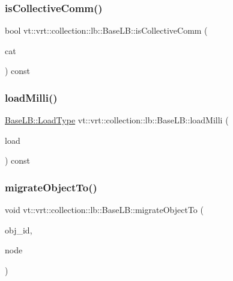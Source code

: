 \subsubsection{\texorpdfstring{is\+Collective\+Comm()}{isCollectiveComm()}}
{\footnotesize\ttfamily bool vt\+::vrt\+::collection\+::lb\+::\+Base\+L\+B\+::is\+Collective\+Comm (\begin{DoxyParamCaption}\item[{\hyperlink{namespacevt_1_1vrt_1_1collection_1_1balance_a9cc6c6884ca0416dae824e9204093c57}{balance\+::\+Comm\+Category}}]{cat }\end{DoxyParamCaption}) const\hspace{0.3cm}{\ttfamily [protected]}}

\mbox{\label{structvt_1_1vrt_1_1collection_1_1lb_1_1_base_l_b_a9293a46022910a7b0b93938dfb886477}} 
\subsubsection{\texorpdfstring{load\+Milli()}{loadMilli()}}
{\footnotesize\ttfamily \hyperlink{structvt_1_1vrt_1_1collection_1_1lb_1_1_base_l_b_a215e22b9f12678303f49615ae3be05cc}{Base\+L\+B\+::\+Load\+Type} vt\+::vrt\+::collection\+::lb\+::\+Base\+L\+B\+::load\+Milli (\begin{DoxyParamCaption}\item[{\hyperlink{structvt_1_1vrt_1_1collection_1_1lb_1_1_base_l_b_a215e22b9f12678303f49615ae3be05cc}{Load\+Type} const \&}]{load }\end{DoxyParamCaption}) const}

\mbox{\label{structvt_1_1vrt_1_1collection_1_1lb_1_1_base_l_b_a952846044ca0d13d25ca828b84112d0e}} 
\subsubsection{\texorpdfstring{migrate\+Object\+To()}{migrateObjectTo()}}
{\footnotesize\ttfamily void vt\+::vrt\+::collection\+::lb\+::\+Base\+L\+B\+::migrate\+Object\+To (\begin{DoxyParamCaption}\item[{\hyperlink{structvt_1_1vrt_1_1collection_1_1lb_1_1_base_l_b_a15a2f756b59c8c2437985206b32aa403}{Obj\+I\+D\+Type} const}]{obj\+\_\+id,  }\item[{\hyperlink{namespacevt_a866da9d0efc19c0a1ce79e9e492f47e2}{Node\+Type} const}]{node }\end{DoxyParamCaption})}

